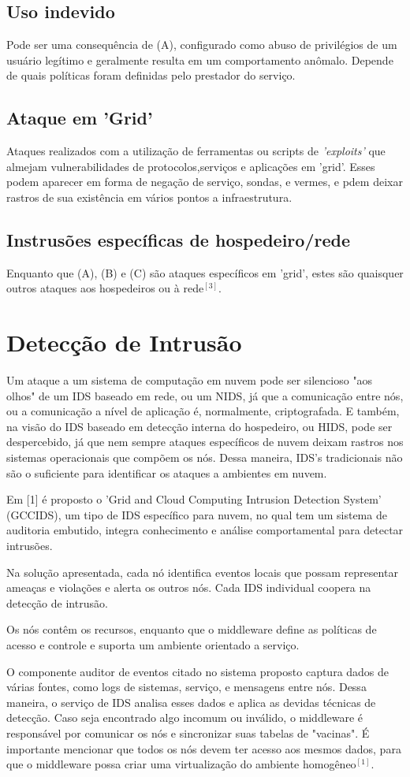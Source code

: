\documentclass[journal]{IEEEtran}
\begin{document}
\subsection{Uso indevido}
Pode ser uma consequência de (A), configurado como abuso de privilégios de um usuário legítimo e geralmente resulta em um comportamento anômalo. Depende de quais políticas foram definidas pelo prestador do serviço.
\subsection{Ataque em 'Grid'}
Ataques realizados com a utilização de ferramentas ou scripts de \textit{'exploits'} que almejam vulnerabilidades de protocolos,serviços e aplicações em 'grid'. Esses podem aparecer em forma de negação de serviço, sondas, e vermes, e pdem deixar rastros de sua existência em vários pontos a infraestrutura.
\subsection{Instrusões específicas de hospedeiro/rede}
Enquanto que (A), (B) e (C) são ataques específicos em 'grid', estes são quaisquer outros ataques aos hospedeiros ou à rede$^{ [3] }$.

\section{Detecção de Intrusão}
Um ataque a um sistema de computação em nuvem pode ser silencioso "aos olhos" de um IDS baseado em rede, ou um NIDS, já que a comunicação entre nós, ou a comunicação a nível de aplicação é, normalmente, criptografada. E também, na visão do IDS baseado em detecção interna do hospedeiro, ou HIDS, pode ser despercebido, já que nem sempre ataques específicos de nuvem deixam rastros nos sistemas operacionais que compõem os nós. Dessa maneira, IDS's tradicionais não são o suficiente para identificar os ataques a ambientes em nuvem. \par
Em [1] é proposto o 'Grid and Cloud Computing Intrusion Detection System' (GCCIDS), um tipo de IDS específico para nuvem, no qual tem um sistema de auditoria embutido, integra conhecimento e análise comportamental para detectar intrusões. \par
Na solução apresentada, cada nó identifica eventos locais que possam representar ameaças e violações e alerta os outros nós. Cada IDS individual coopera na detecção de intrusão. \par
Os nós contêm os recursos, enquanto que o middleware define as políticas de acesso e controle e suporta um ambiente orientado a serviço. \par
O componente auditor de eventos citado no sistema proposto captura dados de várias fontes, como logs de sistemas, serviço, e mensagens entre nós. Dessa maneira, o serviço de IDS analisa esses dados e aplica as devidas técnicas de detecção. Caso seja encontrado algo incomum ou inválido, o middleware é responsável por comunicar os nós e sincronizar suas tabelas de "vacinas". É importante mencionar que todos os nós devem ter acesso aos mesmos dados, para que o middleware possa criar uma virtualização do ambiente homogêneo$^{ [1] }$.
\end{document}

